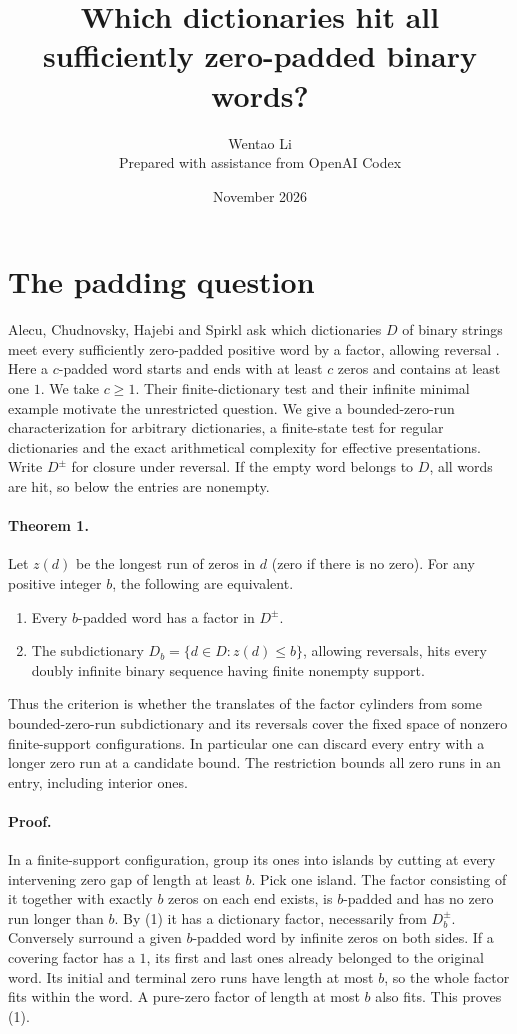 \documentclass[10pt]{article}
\title{Which dictionaries hit all sufficiently zero-padded binary words?}
\author{Wentao Li\\[2pt]\small Prepared with assistance from OpenAI Codex}
\date{November 2026}
\begin{document}
\maketitle
\section{The padding question}
Alecu, Chudnovsky, Hajebi and Spirkl ask which dictionaries $D$ of binary strings meet every sufficiently zero-padded positive word by a factor, allowing reversal \cite[Question 8.3]{achs}. Here a $c$-padded word starts and ends with at least $c$ zeros and contains at least one $1$. We take $c\ge1$. Their finite-dictionary test and their infinite minimal example motivate the unrestricted question. We give a bounded-zero-run characterization for arbitrary dictionaries, a finite-state test for regular dictionaries and the exact arithmetical complexity for effective presentations. Write $D^\pm$ for closure under reversal. If the empty word belongs to $D$, all words are hit, so below the entries are nonempty.

\paragraph{Theorem 1.} Let $z(d)$ be the longest run of zeros in $d$ (zero if there is no zero). For any positive integer $b$, the following are equivalent.
\begin{enumerate}
\item Every $b$-padded word has a factor in $D^\pm$.
\item The subdictionary $D_b=\{d\in D:z(d)\le b\}$, allowing reversals, hits every doubly infinite binary sequence having finite nonempty support.
\end{enumerate}
Thus the criterion is whether the translates of the factor cylinders from some bounded-zero-run subdictionary and its reversals cover the fixed space of nonzero finite-support configurations. In particular one can discard every entry with a longer zero run at a candidate bound. The restriction bounds all zero runs in an entry, including interior ones.

\paragraph{Proof.} In a finite-support configuration, group its ones into islands by cutting at every intervening zero gap of length at least $b$. Pick one island. The factor consisting of it together with exactly $b$ zeros on each end exists, is $b$-padded and has no zero run longer than $b$. By (1) it has a dictionary factor, necessarily from $D_b^\pm$. Conversely surround a given $b$-padded word by infinite zeros on both sides. If a covering factor has a $1$, its first and last ones already belonged to the original word. Its initial and terminal zero runs have length at most $b$, so the whole factor fits within the word. A pure-zero factor of length at most $b$ also fits. This proves (1).
\end{document}
